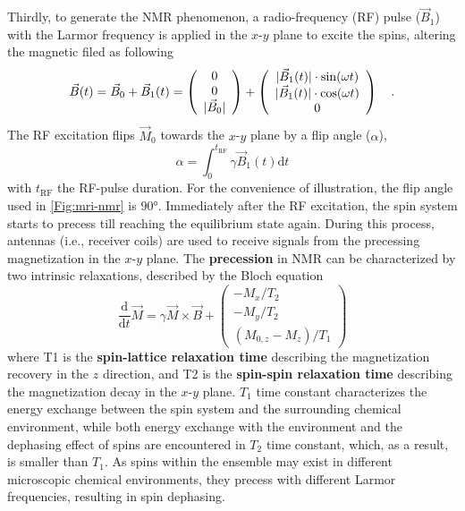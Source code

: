Thirdly, to generate the NMR phenomenon, a radio-frequency (\acs{RF}) pulse ($\vec{B}_{1}$) with the Larmor frequency is applied in the $x$-$y$ plane to excite the spins, altering the magnetic filed as following 
\begin{equation}
  \vec{B}(t) = \vec{B}_0 + \vec{B}_{1} (t) = 
  \left( \begin{array}{c} 
    0 \\
    0 \\
    \lvert\vec{B}_0\rvert
  \end{array} \right) + 
  \left( \begin{array}{c} 
    \lvert\vec{B}_{1} (t)\rvert \cdot \sin(\omega t) \\
    \lvert\vec{B}_{1} (t)\rvert \cdot \cos(\omega t) \\
    0
  \end{array} \right) \quad .
\end{equation}
The RF excitation flips $\vec{M}_0$ towards the $x$-$y$ plane by a flip angle ($\alpha$),
\begin{equation}
  \alpha = \int_{0}^{t_{\text{RF}}} \gamma \vec{B}_{1} (t) \text{d} t
\end{equation}
with $t_{\text{RF}}$ the RF-pulse duration. For the convenience of illustration, the flip angle used in \cref{Fig:mri-nmr} is \ang{90}. Immediately after the RF excitation, the spin system starts to precess till reaching the equilibrium state again. During this process, antennas (i.e., receiver coils) are used to receive signals from the precessing magnetization in the $x$-$y$ plane. The \textbf{precession} in NMR can be characterized by two intrinsic relaxations, described by the Bloch equation \cite{1946_NMR_Bloch}
\begin{equation} \label{Equ:mri_bloch}
  \frac{\text{d}}{\text{d} t} \vec{M} = \gamma \vec{M} \times \vec{B} + 
  \left( \begin{array}{c} 
    - M_{x} / T_2 \\
    - M_{y} / T_2 \\
    ( M_{0,z} - M_{z} ) / T_1
  \end{array} \right)
\end{equation}
where \acs{T1} is the \textbf{spin-lattice relaxation time} describing the magnetization recovery in the $z$ direction, and \acs{T2} is the \textbf{spin-spin relaxation time} describing the magnetization decay in the $x$-$y$ plane. $T_1$ time constant characterizes the energy exchange between the spin system and the surrounding chemical environment, while both energy exchange with the environment and the dephasing effect of spins are encountered in $T_2$ time constant, which, as a result, is smaller than $T_1$. As spins within the ensemble may exist in different microscopic chemical environments, they precess with different Larmor frequencies, resulting in spin dephasing.

